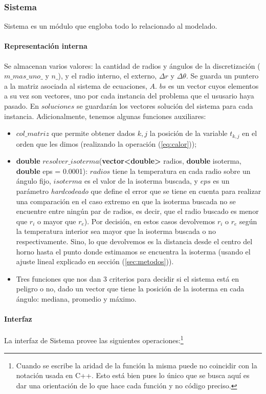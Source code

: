 \subsubsection{Sistema}
Sistema es un módulo que engloba todo lo relacionado al modelado.

\paragraph{Representación interna}
Se almacenan varios valores: la cantidad de radios y ángulos de la discretización ($m\_mas\_uno\_$ y $n\_$), y el radio interno, el externo, $\Delta r$ y $\Delta\theta$. Se guarda un puntero a la matriz asociada al sistema de ecuaciones, $A$. $bs$ es un vector cuyos elementos a su vez son vectores, uno por cada instancia del problema que el ususario haya pasado. En $soluciones$ se guardarán los vectores solución del sistema para cada instancia.
Adicionalmente, tenemos algunas funciones auxiliares: 

\begin{itemize}
	\item $col\_matriz$ que permite obtener dados $k,j$ la posición de la variable $t_{k,j}$ en el orden que les dimos (realizando la operación (\ref{eq:calor}));
	\item \textbf{double} $resolver\_isoterma$(\textbf{vector<double>} radios, \textbf{double} isoterma, \textbf{double} eps = 0.0001): $radios$ tiene la temperatura en cada radio sobre un ángulo fijo, $isoterma$ es el valor de la isoterma buscada, y $eps$ es un parámetro \textit{hardcodeado} que define el error que se tiene en cuenta para realizar una comparación en el caso extremo en que la isoterma buscada no se encuentre entre ningún par de radios, es decir, que el radio buscado es menor que $r_i$ o mayor que $r_e$). Por decisión, en estos casos devolvemos $r_i$ o $r_e$ según la temperatura interior sea mayor que la isoterma buscada o no respectivamente. Sino, lo que devolvemos es la distancia desde el centro del horno hasta el punto donde estimamos se encuentra la isoterma (usando el ajuste lineal explicado en sección (\ref{sec:metodos})).
	\item Tres funciones que nos dan 3 criterios para decidir si el sistema está en peligro o no, dado un vector que tiene la posición de la isoterma en cada ángulo: mediana, promedio y máximo. 
\end{itemize}

\paragraph{Interfaz}
La interfaz de Sistema provee las siguientes operaciones:\footnote{Cuando se escribe la aridad de la función la misma puede no coincidir con la notación usada en C++. Esto está bien pues lo único que se busca aquí es dar una orientación de lo que hace cada función y no código preciso.}

